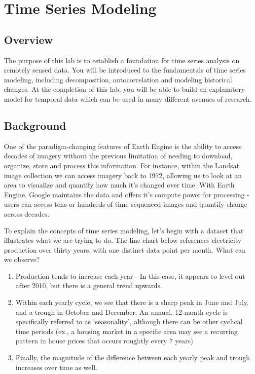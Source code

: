 \documentclass[
]{article}
\begin{document}
\hypertarget{lab5}{%
\section{Time Series Modeling}\label{lab5}}

\hypertarget{overview-5}{%
\subsection*{Overview}\label{overview-5}}

The purpose of this lab is to establish a foundation for time series analysis on remotely sensed data. You will be introduced to the fundamentals of time series modeling, including decomposition, autocorrelation and modeling historical changes. At the completion of this lab, you will be able to build an explanatory model for temporal data which can be used in many different avenues of research.

\hypertarget{background}{%
\subsection{Background}\label{background}}

One of the paradigm-changing features of Earth Engine is the ability to access decades of imagery without the previous limitation of needing to download, organize, store and process this information. For instance, within the Landsat image collection we can access imagery back to 1972, allowing us to look at an area to visualize and quantify how much it's changed over time. With Earth Engine, Google maintains the data and offers it's compute power for processing - users can access tens or hundreds of time-sequenced images and quantify change across decades.

To explain the concepts of time series modeling, let's begin with a dataset that illustrates what we are trying to do. The line chart below references electricity production over thirty years, with one distinct data point per month. What can we observe?

\begin{enumerate}
\def\labelenumi{\arabic{enumi}.}
\item
  Production tends to increase each year - In this case, it appears to level out after 2010, but there is a general trend upwards.
\item
  Within each yearly cycle, we see that there is a sharp peak in June and July, and a trough in October and December. An annual, 12-month cycle is specifically referred to as `seasonality', although there can be other cyclical time periods (ex., a housing market in a specific area may see a recurring pattern in house prices that occurs roughtly every 7 years)
\item
  Finally, the magnitude of the difference between each yearly peak and trough increases over time as well.
\end{enumerate}
\end{document}
